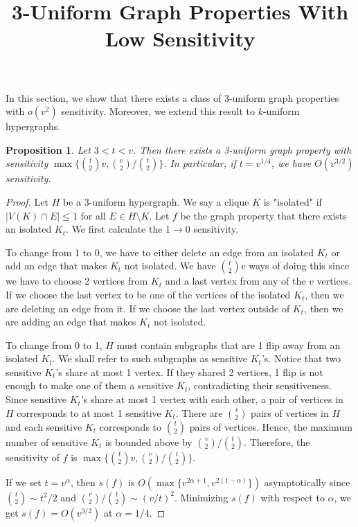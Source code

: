 \documentclass[psamsfonts]{amsart}
\title{3-Uniform Graph Properties With Low Sensitivity}
\newtheorem{prop}[thm]{Proposition}
\theoremstyle{definition}
\theoremstyle{remark}
\numberwithin{equation}{section}
\begin{document}
\maketitle

In this section, we show that there exists a class of 3-uniform graph properties with $o(v^2)$ sensitivity. Moreover, we extend this result to $k$-uniform hypergraphs.

\begin{prop} Let $3 < t < v$. Then there exists a 3-uniform graph property with sensitivity $\max \{ {t \choose 2}v, {v \choose 2}/{t \choose 2}\}$. In particular, if $t = v^{1/4}$, we have $O(v^{3/2})$ sensitivity.
\end{prop}

\begin{proof}
Let $H$ be a 3-uniform hypergraph. We say a clique $K$ is "isolated" if $|V(K) \cap E| \leq 1$ for all $E \in H\setminus K$. Let $f$ be the graph property that there exists an isolated $K_t$. We first calculate the $1 \rightarrow 0$ sensitivity.

To change from 1 to 0, we have to either delete an edge from an isolated $K_t$ or add an edge that makes $K_t$ not isolated. We have ${t \choose 2}v$ ways of doing this since we have to choose 2 vertices from $K_t$ and a last vertex from any of the $v$ vertices. If we choose the last vertex to be one of the vertices of the isolated $K_t$, then we are deleting an edge from it. If we choose the last vertex outside of $K_t$, then we are adding an edge that makes $K_t$ not isolated.

To change from 0 to 1, $H$ must contain subgraphs that are 1 flip away from an isolated $K_t$. We shall refer to such subgraphs as sensitive $K_t$'s. Notice that two sensitive $K_t$'s share at most 1 vertex. If they shared 2 vertices, 1 flip is not enough to make one of them a sensitive $K_t$, contradicting their sensitiveness. Since sensitive $K_t$'s share at most 1 vertex with each other, a pair of vertices in $H$ corresponds to at most 1 sensitive $K_t$. There are ${v \choose 2}$ pairs of vertices in $H$ and each sensitive $K_t$ corresponds to ${t \choose 2}$ pairs of vertices. Hence, the maximum number of sensitive $K_t$ is bounded above by ${v \choose 2}/{t \choose 2}$. Therefore, the sensitivity of $f$ is $\max \{ {t \choose 2}v, {v \choose 2}/{t \choose 2}\}$.


If we set $t = v^\alpha$, then $s(f)$ is $O(\max \{ v^{2\alpha + 1}, v^{2(1-\alpha)}\})$ asymptotically since ${t \choose 2} \sim t^2/2$ and ${v \choose 2}/{t \choose 2} \sim (v/t)^2$. Minimizing $s(f)$ with respect to $\alpha$, we get $s(f) = O(v^{3/2})$ at $\alpha = 1/4$.
\end{proof}
\end{document}
